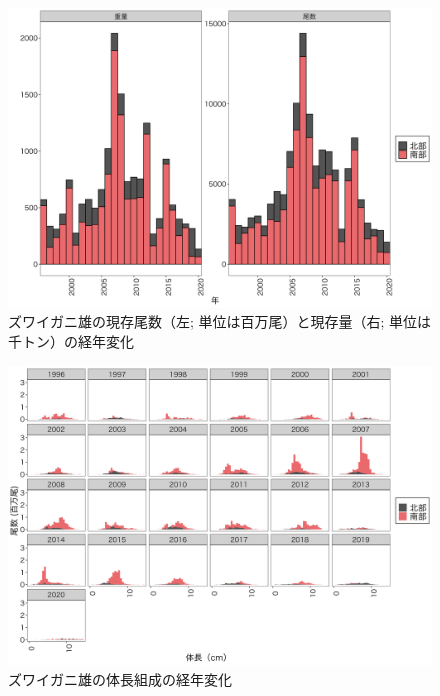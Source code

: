 \documentclass[11pt]{article} %
\begin{document}
\begin{linenumbers}
\begin{figure}[h]
  \centering
  \includegraphics[width = 14cm]{ズワイガニ雄trend.png}
  \caption{ズワイガニ雄の現存尾数（左; 単位は百万尾）と現存量（右; 単位は千トン）の経年変化}
\end{figure}

\begin{figure}[h]
  \centering
  \includegraphics[width = 14cm]{ズワイガニ雄length.png}
  \caption{ズワイガニ雄の体長組成の経年変化}
\end{figure}


\end{linenumbers}
\end{document}
